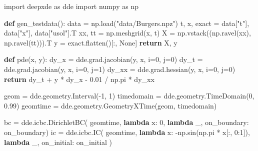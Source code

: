 \documentclass[
  spanish,
  us-letterpaper,
  DIV=11,
  numbers=noendperiod]{scrreprt}
\newenvironment{Shaded}{\begin{snugshade}}{\end{snugshade}}
\newcommand{\ControlFlowTok}[1]{\textcolor[rgb]{0.00,0.23,0.31}{\textbf{#1}}}
\newcommand{\DecValTok}[1]{\textcolor[rgb]{0.68,0.00,0.00}{#1}}
\newcommand{\FloatTok}[1]{\textcolor[rgb]{0.68,0.00,0.00}{#1}}
\newcommand{\ImportTok}[1]{\textcolor[rgb]{0.00,0.46,0.62}{#1}}
\newcommand{\KeywordTok}[1]{\textcolor[rgb]{0.00,0.23,0.31}{\textbf{#1}}}
\newcommand{\NormalTok}[1]{\textcolor[rgb]{0.00,0.23,0.31}{#1}}
\newcommand{\OperatorTok}[1]{\textcolor[rgb]{0.37,0.37,0.37}{#1}}
\newcommand{\StringTok}[1]{\textcolor[rgb]{0.13,0.47,0.30}{#1}}
\newcommand{\VariableTok}[1]{\textcolor[rgb]{0.07,0.07,0.07}{#1}}
\theoremstyle{plain}
\theoremstyle{definition}
\theoremstyle{remark}
\begin{document}
\begin{Shaded}
\begin{Highlighting}[]
\ImportTok{import}\NormalTok{ deepxde }\ImportTok{as}\NormalTok{ dde}
\ImportTok{import}\NormalTok{ numpy }\ImportTok{as}\NormalTok{ np}


\KeywordTok{def}\NormalTok{ gen\_testdata():}
\NormalTok{    data }\OperatorTok{=}\NormalTok{ np.load(}\StringTok{"data/Burgers.npz"}\NormalTok{)}
\NormalTok{    t, x, exact }\OperatorTok{=}\NormalTok{ data[}\StringTok{"t"}\NormalTok{], data[}\StringTok{"x"}\NormalTok{], data[}\StringTok{"usol"}\NormalTok{].T}
\NormalTok{    xx, tt }\OperatorTok{=}\NormalTok{ np.meshgrid(x, t)}
\NormalTok{    X }\OperatorTok{=}\NormalTok{ np.vstack((np.ravel(xx), np.ravel(tt))).T}
\NormalTok{    y }\OperatorTok{=}\NormalTok{ exact.flatten()[:, }\VariableTok{None}\NormalTok{]}
    \ControlFlowTok{return}\NormalTok{ X, y}


\KeywordTok{def}\NormalTok{ pde(x, y):}
\NormalTok{    dy\_x }\OperatorTok{=}\NormalTok{ dde.grad.jacobian(y, x, i}\OperatorTok{=}\DecValTok{0}\NormalTok{, j}\OperatorTok{=}\DecValTok{0}\NormalTok{)}
\NormalTok{    dy\_t }\OperatorTok{=}\NormalTok{ dde.grad.jacobian(y, x, i}\OperatorTok{=}\DecValTok{0}\NormalTok{, j}\OperatorTok{=}\DecValTok{1}\NormalTok{)}
\NormalTok{    dy\_xx }\OperatorTok{=}\NormalTok{ dde.grad.hessian(y, x, i}\OperatorTok{=}\DecValTok{0}\NormalTok{, j}\OperatorTok{=}\DecValTok{0}\NormalTok{)}
    \ControlFlowTok{return}\NormalTok{ dy\_t }\OperatorTok{+}\NormalTok{ y }\OperatorTok{*}\NormalTok{ dy\_x }\OperatorTok{{-}} \FloatTok{0.01} \OperatorTok{/}\NormalTok{ np.pi }\OperatorTok{*}\NormalTok{ dy\_xx}


\NormalTok{geom }\OperatorTok{=}\NormalTok{ dde.geometry.Interval(}\OperatorTok{{-}}\DecValTok{1}\NormalTok{, }\DecValTok{1}\NormalTok{)}
\NormalTok{timedomain }\OperatorTok{=}\NormalTok{ dde.geometry.TimeDomain(}\DecValTok{0}\NormalTok{, }\FloatTok{0.99}\NormalTok{)}
\NormalTok{geomtime }\OperatorTok{=}\NormalTok{ dde.geometry.GeometryXTime(geom, timedomain)}

\NormalTok{bc }\OperatorTok{=}\NormalTok{ dde.icbc.DirichletBC(}
\NormalTok{    geomtime,}
    \KeywordTok{lambda}\NormalTok{ x: }\DecValTok{0}\NormalTok{,}
    \KeywordTok{lambda}\NormalTok{ \_, on\_boundary: on\_boundary)}
\NormalTok{ic }\OperatorTok{=}\NormalTok{ dde.icbc.IC(}
\NormalTok{    geomtime,}
    \KeywordTok{lambda}\NormalTok{ x: }\OperatorTok{{-}}\NormalTok{np.sin(np.pi }\OperatorTok{*}\NormalTok{ x[:, }\DecValTok{0}\NormalTok{:}\DecValTok{1}\NormalTok{]),}
    \KeywordTok{lambda}\NormalTok{ \_, on\_initial: on\_initial}
\NormalTok{)}


\end{Highlighting}
\end{Shaded}
\end{document}

